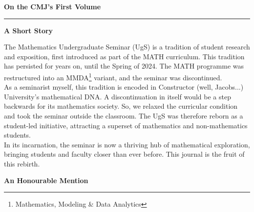 \clearpage
\thispagestyle{frontmatter}

\vspace*{0.5cm}

\begin{center}
  {\LARGE\bfseries\color{cujblue}On the CMJ's First Volume}\label{art:volume}
\end{center}

\vspace{0.3cm}
\noindent\textcolor{cujgold}{\rule{\textwidth}{1.2pt}}
\vspace{0.3cm}




      {\large\bfseries\color{cujblue}A Short Story}

      \vspace{0.3cm}

      The Mathematics Undergraduate Seminar (UgS) is a tradition of student research and exposition,
      first introduced as part of the MATH curriculum. This tradition has persisted for years on, 
      until the Spring of 2024. The MATH programme was restructured into an MMDA\footnote{Mathematics, Modeling \& Data Analytics} variant,
      and the seminar was discontinued.\\[0.3cm]
      As a seminarist myself, this tradition is encoded in Constructor (well, Jacobs...) University's mathematical DNA. 
      A discontinuation in itself would be a step backwards for its mathematics society. So, we relaxed the curricular condition and took the
      seminar outside the classroom. The UgS was therefore reborn as a student-led initiative, attracting a superset of mathematics and non-mathematics students.\\[0.3cm]
      In its incarnation, the seminar is now a thriving hub of mathematical exploration, bringing students and faculty closer than ever before.  
      This journal is the fruit of this rebirth.

      \vspace{0.5cm}

      {\large\bfseries\color{cujblue}An Honourable Mention}
  
